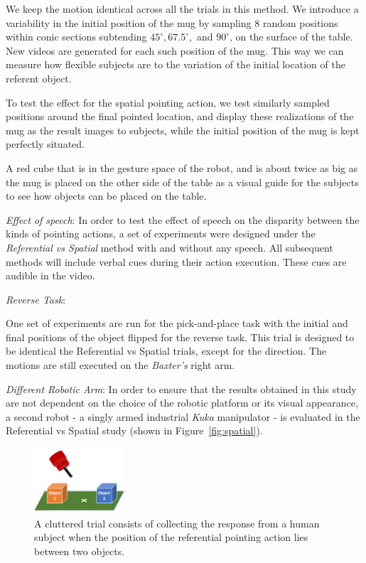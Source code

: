 We keep the motion identical across all the trials in this method. 
We introduce a variability in the initial position of the mug by sampling $8$ random positions within conic sections subtending $45^{\circ} , 67.5^{\circ}, $ and $90^{\circ}$, on the surface of the table. New videos are generated for each such position of the mug.
This way we can measure how flexible subjects are to the variation of the initial location of the referent object. 

To test the effect for the spatial pointing action, we test similarly sampled positions around the final pointed location, and display these realizations of the mug as the result images to subjects, while the initial position of the mug is kept perfectly situated. 

 A red cube that is in the gesture space of the robot, and is about twice as big as the mug is placed on the other side of the table as a visual guide for the subjects to see how objects can be placed on the table. 

\noindent\textit{Effect of speech}: In order to test the effect of speech on the disparity between the kinds of pointing actions, a set of experiments were designed under the \textit{Referential vs Spatial} method with and without any speech. All subsequent methods will include verbal cues during their action execution. These cues are audible in the video.


\noindent\textit{Reverse Task}: 

One set of experiments are run for the pick-and-place task with the initial and final positions of the object flipped for the reverse task. This trial is designed to be identical the Referential vs Spatial trials, except for the direction. The motions are still executed on the \textit{Baxter's} right arm. 


\noindent\textit{Different Robotic Arm}:
In order to ensure that the results obtained in this study are not dependent on the choice of the robotic platform or its visual appearance, a second robot - a singly armed industrial \textit{Kuka} manipulator - is evaluated in the Referential vs Spatial study (shown in Figure~\ref{fig:spatial}).

\begin{figure}[t]
    \centering
    \includegraphics[width=0.3\textwidth]{figures/clutter_trial.png}
    \caption{A cluttered trial consists of collecting the response from a human subject when the position of the referential pointing action lies between two objects.}
    \label{fig:cluttered_trial}
\end{figure}
